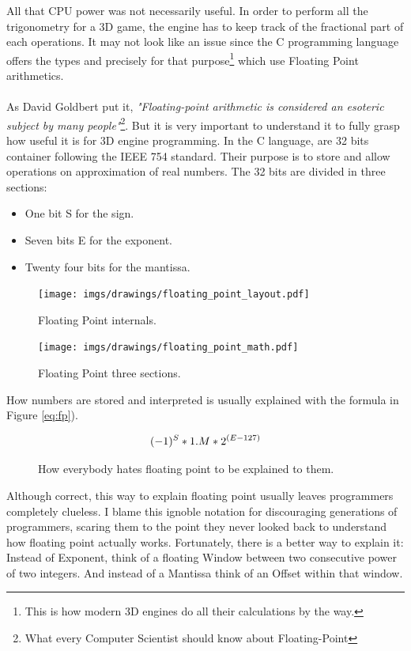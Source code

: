 \documentclass[book.tex]{subfiles}
\begin{document}
   All that CPU power was not necessarily useful. In order to perform all the trigonometry for a 3D game, the engine has to keep track of the fractional part of each operations. It may not look like an issue since the C programming language offers the types  and  precisely for that purpose\footnote{This is how modern 3D engines do all their calculations by the way.} which use Floating Point arithmetics.\\
\\
As David Goldbert put it, \emph{"Floating-point arithmetic is considered an esoteric subject by many people"}\footnote{What every Computer Scientist should know about Floating-Point}. But it is very important to understand it to fully grasp how useful it is for 3D engine programming. In the C language,  are 32 bits container following the IEEE 754 standard. Their purpose is to store and allow operations on approximation of real numbers. The 32 bits are divided in three sections:\\
\begin{itemize}
  \item One bit S for the sign.
  \item Seven bits E for the exponent.
  \item Twenty four bits for the mantissa.
\end{itemize} 

\begin{figure}[H]
\centering
\texttt{[image: imgs/drawings/floating\_point\_layout.pdf]}
\caption{Floating Point internals.}
\end{figure}
  \bigskip



\begin{figure}[H]
\centering
\texttt{[image: imgs/drawings/floating\_point\_math.pdf]}
\caption{Floating Point three sections.}
\end{figure}
  \bigskip  


How numbers are stored and interpreted is usually explained with the formula in Figure \ref{eq:fp}).\

\begin{figure}[H]
\begin{equation}\label{eq:fp}
\large
(-1)^S * 1.M * 2^{(E-127)}
\end{equation}
 \caption{How everybody hates floating point to be explained to them.}
\end{figure}
\bigskip  

Although correct, this way to explain floating point usually leaves programmers completely clueless. I blame this ignoble notation for discouraging generations of programmers, scaring them to the point they never looked back to understand how floating point actually works. Fortunately, there is a better way to explain it: Instead of Exponent, think of a floating Window between two consecutive power of two integers. And instead of a Mantissa think of an Offset within that window.\\ 
\par
  
\end{document}
